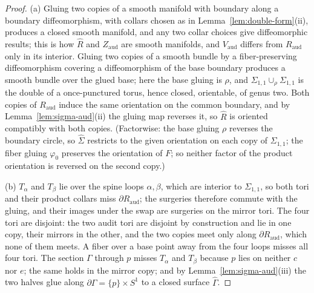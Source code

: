 \documentclass[11pt]{article}
\theoremstyle{definition}
\begin{document}
\begin{proof}
(a) Gluing two copies of a smooth manifold with boundary along a
boundary diffeomorphism, with collars chosen as in
Lemma~\ref{lem:double-form}(ii), produces a closed smooth manifold, and
any two collar choices give diffeomorphic results; this is how $\hat R$
and $Z_{\mathrm{aud}}$ are smooth manifolds, and $V_{\mathrm{aud}}$
differs from $R_{\mathrm{aud}}$ only in its interior.  Gluing two copies
of a smooth bundle by a fiber-preserving diffeomorphism covering a
diffeomorphism of the base boundary produces a smooth bundle over the
glued base; here the base gluing is $\rho$, and
$\Sigma_{1,1}\cup_\rho\Sigma_{1,1}$ is the double of a once-punctured
torus, hence closed, orientable, of genus two.  Both
copies of $R_{\mathrm{aud}}$ induce the same orientation on the common
boundary, and by Lemma~\ref{lem:sigma-aud}(ii) the gluing map reverses
it, so $\hat R$ is oriented compatibly with both copies.  (Factorwise:
the base gluing $\rho$ reverses the boundary circle, so $\hat\Sigma$
restricts to the given orientation on each copy of $\Sigma_{1,1}$; the
fiber gluing $\varphi_0$ preserves the orientation of $F$; so neither
factor of the product orientation is reversed on the second copy.)

(b) $T_\alpha$ and $T_\beta$ lie over the spine loops $\alpha,\beta$,
which are interior to $\Sigma_{1,1}$, so both tori and their product
collars miss $\partial R_{\mathrm{aud}}$; the surgeries therefore commute
with the gluing, and their images under the swap are surgeries on the
mirror tori.  The four tori are disjoint: the two audit tori are disjoint
by construction and lie in one copy, their mirrors in the other, and the
two copies meet only along $\partial R_{\mathrm{aud}}$, which none of
them meets.  A fiber over a base point away from the four loops misses all
four tori.  The section $\Gamma$ through $p$ misses $T_\alpha$ and
$T_\beta$ because $p$ lies on neither $c$ nor $e$; the same holds in the
mirror copy; and by Lemma~\ref{lem:sigma-aud}(iii) the two halves glue
along $\partial\Gamma=\{p\}\times S^1$ to a closed surface $\hat\Gamma$.


\end{proof}
\end{document}
